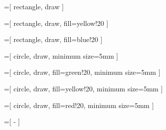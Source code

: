 
=[
	rectangle,
	draw
]

=[
	rectangle,
	draw,
	fill=yellow!20
]

=[
	rectangle,
	draw,
	fill=blue!20
]

=[
	circle,
	draw,
	minimum size=5mm
]

=[
	circle,
	draw,
	fill=green!20,
	minimum size=5mm
]

=[
	circle,
	draw,
	fill=yellow!20,
	minimum size=5mm
]

=[
	circle,
	draw,
	fill=red!20,
	minimum size=5mm
]

=[
	-
]

\newcommand{\atomlegend}[2]{
	\node [rectangle,draw,fill=blue!20,minimum width=0.8cm] (body) at(#1,#2) {};
	\node [] (bodyLabel)							at(#1+1.4,#2)			{corps};
	\node [rectangle,draw,fill=yellow!20,minimum width=0.8cm] (head) at(#1,#2-0.5) {};
	\node [] (headLabel)							at(#1+1.4,#2-0.5)				{tête};
	\node [rectangle,draw,fill=green!20,minimum width=0.8cm] (fr) at(#1,#2-1) {};
	\node [] (frLabel)							at(#1+1.4,#2-1)				{frontière};
	\node [rectangle,draw,fill=red!20,minimum width=0.8cm] (cst) at(#1,#2-1.5) {};
	\node [] (cstLabel)							at(#1+1.4,#2-1.5)				{constantes};
}


